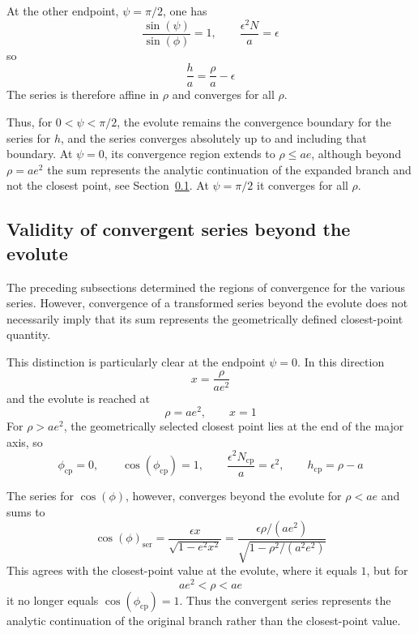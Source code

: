\documentclass[a4paper]{amsart}
\begin{document}
At the other endpoint, $\psi=\pi/2$, one has
\begin{equation*}
\frac{\sin(\psi)}{\sin(\phi)}=1,
\qquad
\frac{\epsilon^2N}{a}=\epsilon
\end{equation*}
so
\begin{equation*}
\frac{h}{a}=\frac{\rho}{a}-\epsilon
\end{equation*}
The series is therefore affine in $\rho$ and converges for all $\rho$.

Thus, for $0<\psi<\pi/2$, the evolute remains the convergence boundary for the series for $h$, and the series converges absolutely up to and including that boundary. At $\psi=0$, its convergence region extends to $\rho\leq ae$, although beyond $\rho=ae^2$ the sum represents the analytic continuation of the expanded branch and not the closest point, see Section~\ref{sec:validity_beyond}. At $\psi=\pi/2$ it converges for all $\rho$.


\subsection{Validity of convergent series beyond the evolute}\label{sec:validity_beyond}
The preceding subsections determined the regions of convergence for the various series. However, convergence of a transformed series beyond the evolute does not necessarily imply that its sum represents the geometrically defined closest-point quantity.

This distinction is particularly clear at the endpoint $\psi=0$. In this direction
\begin{equation*}
x=\frac{\rho}{ae^2}
\end{equation*}
and the evolute is reached at
\begin{equation*}
\rho=ae^2,\qquad x=1
\end{equation*}
For $\rho>ae^2$, the geometrically selected closest point lies at the end of the major axis, so
\begin{equation*}
\phi_{\mathrm{cp}}=0,
\qquad
\cos(\phi_{\mathrm{cp}})=1,
\qquad
\frac{\epsilon^2N_{\mathrm{cp}}}{a}=\epsilon^2,
\qquad
h_{\mathrm{cp}}=\rho-a
\end{equation*}

The series for $\cos(\phi)$, however, converges beyond the evolute for $\rho<ae$ and sums to
\begin{equation*}
\cos(\phi)_{\mathrm{ser}}
= \frac{\epsilon x}{\sqrt{1-e^2x^2}}
=
\frac{\epsilon\rho/(ae^2)}
{\sqrt{1-\rho^2/(a^2e^2)}}
\end{equation*}
This agrees with the closest-point value at the evolute, where it equals $1$, but for
\begin{equation*}
ae^2<\rho<ae
\end{equation*}
it no longer equals $\cos(\phi_{\mathrm{cp}})=1$. Thus the convergent series represents the analytic continuation of the original branch rather than the closest-point value.
\end{document}

